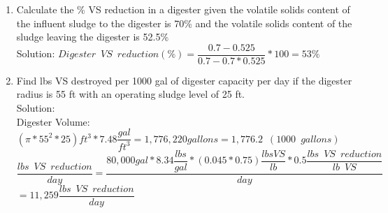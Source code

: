                 \begin{enumerate}
                    \item Calculate the \% VS reduction in a digester given the volatile solids content of the influent sludge to the digester is 70\% and the volatile solids content of the sludge leaving the digester is 52.5\%\\
                    Solution:  $Digester \enspace VS \enspace reduction (\%)=\dfrac{0.7-0.525}{0.7-0.7*0.525}*100=\boxed{ 53\%}$\\
                    \vspace{0.2cm}


                    \item Find lbs VS destroyed per 1000 gal of digester capacity per day if the digester radius is 55 ft with an operating sludge level of 25 ft.\\

                    \vspace{1cm}
                    Solution:\\
                    Digester Volume: 
                    $
                    {
                            (\pi*55^2*25)ft^3 *7.48 \dfrac{gal}{ft^3}
                        }=1,776,220 gallons=1,776.2 \enspace(1000 \enspace gallons)
                    $
                    \\
                    \vspace{3mm}
                    $
                        \dfrac
                        {
                        lbs \enspace VS \enspace reduction
                        }
                        {
                        day
                        }
                        =
                        \dfrac
                        {
                        80,000 gal * 8.34 \dfrac{lbs}{gal}*(0.045*0.75) \dfrac{lbs VS}{lb}*0.5\dfrac{lbs \enspace VS \enspace  reduction}{lb \enspace VS}
                        }
                        {
                        day
                        }$\\
                    \vspace{0.5cm}
                    $
                        =11,259
                        \dfrac
                        {
                        lbs \enspace VS \enspace reduction
                        }
                        {
                        day 
                        }
                    $
                    \\
                    \vspace{3mm}



\end{enumerate}
